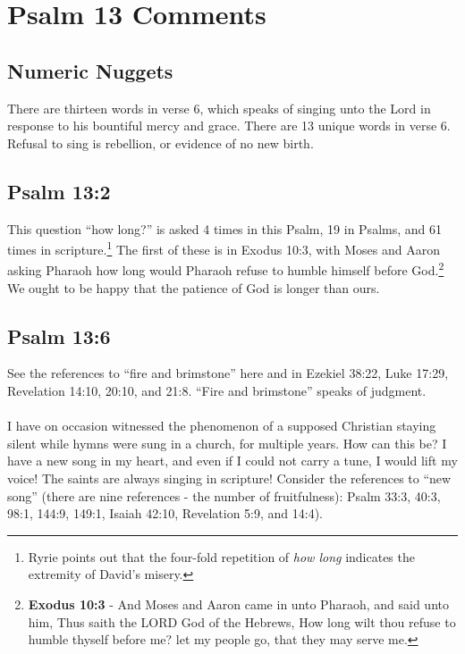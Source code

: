 \section{Psalm 13 Comments}

\subsection{Numeric Nuggets}
There are thirteen words in verse 6, which speaks of singing unto the Lord in response to his bountiful mercy and grace. There are 13 unique words in verse 6. Refusal to sing is rebellion, or evidence of no new birth.

\subsection{Psalm 13:2}
This question ``how long?'' is asked 4 times in this Psalm, 19 in Psalms, and 61 times in scripture.\footnote{Ryrie points out that the four-fold repetition of \emph{how long} indicates the extremity of David's misery.} The first of these is in Exodus 10:3, with Moses and Aaron asking Pharaoh how long would Pharaoh refuse to humble himself before God.\footnote{\textbf{Exodus 10:3} - And Moses and Aaron came in unto Pharaoh, and said unto him, Thus saith the LORD God of the Hebrews, How long wilt thou refuse to humble thyself before me? let my people go, that they may serve me.} We ought to be happy that the patience of God is longer than ours.


\subsection{Psalm 13:6}
See the references to ``fire and brimstone'' here and in Ezekiel 38:22, Luke 17:29, Revelation 14:10, 20:10, and 21:8. ``Fire and brimstone'' speaks of judgment.\\
\\
I have on occasion witnessed the phenomenon of a supposed Christian staying silent while hymns were sung in a church, for multiple years.  How can this be? I have a new song in my heart, and even if I could not carry a tune, I would lift my voice!   The saints are always singing in scripture! Consider the references to ``new song'' (there are nine references - the number of fruitfulness): Psalm 33:3, 40:3, 98:1, 144:9, 149:1, Isaiah 42:10, Revelation 5:9, and 14:4).